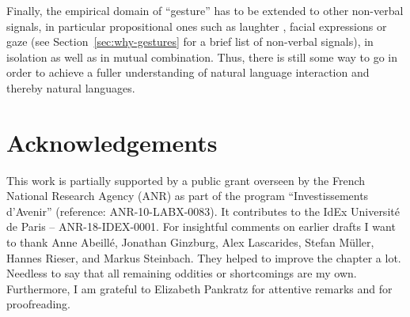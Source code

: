 \documentclass[output=paper
                ,modfonts
                ,nonflat
	        ,collection
	        ,collectionchapter
	        ,collectiontoclongg
 	        ,biblatex
                ,babelshorthands
                ,newtxmath
                ,draftmode
                ,colorlinks, citecolor=brown
]{./langsci/langscibook}
\begin{document}
Finally, the empirical domain of \enquote{gesture} has to be extended to other non-verbal signals, in particular propositional ones such as laughter \citep{Ginzburg:Breitholz:Cooper:Hough:Tian:2015}, facial expressions or gaze (see Section~\ref{sec:why-gestures} for a brief list of non-verbal signals), in isolation as well as in mutual combination.
%
Thus, there is still some way to go in order to achieve a fuller understanding of natural language interaction and thereby natural languages.


 
\section*{Acknowledgements}


This work is partially supported by a public grant overseen by the French National Research Agency (ANR) as part of the program ``Investissements d'Avenir'' (reference: ANR-10-LABX-0083). It contributes to the IdEx Université de Paris -- ANR-18-IDEX-0001. For insightful comments on earlier drafts I want to thank Anne Abeillé, Jonathan Ginzburg, Alex Lascarides, Stefan Müller, Hannes Rieser, and Markus Steinbach. They helped to improve the chapter a lot. Needless to say that all remaining oddities or shortcomings are my own. Furthermore, I am grateful to Elizabeth Pankratz for attentive remarks and for proofreading. 



{\sloppy
\printbibliography[heading=subbibliography,notkeyword=this]
}
\end{document}
